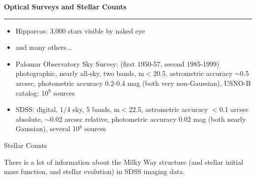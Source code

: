 \documentclass[letterpaper,landscape]{slides}
\begin{document}
\begin{slide}
\begin{center}
\bfseries
{\large {\color{red} Optical Surveys and Stellar Counts}}
\end{center}
\vskip 0.2in
\hrule

\vskip 0.1in
\begin{itemize}
\item { Hipparcos:} 3,000 stars visible by naked eye
\item { and many others...} 
\item { Palomar Observatory Sky Survey:} (first 1950-57, second 1985-1999) 
         photographic, nearly all-sky, 
         two bands, m$<$20.5, astrometric accuracy $\sim$0.5 arcsec, photometric
         accuracy 0.2-0.4 mag (both very non-Gaussian), USNO-B catalog: 10$^9$ sources
\item { SDSS:} digital, 1/4 sky, 5 bands, m$<$22.5, astrometric accuracy 
        $<$0.1 arcsec absolute,  $\sim$0.02 arcsec relative, photometric
         accuracy 0.02 mag (both nearly Gaussian), several 10$^8$ sources
\end{itemize}
\end{slide}
 




\begin{slide}
\begin{center}
{\large \color{red} 
                    Stellar Counts
}
\end{center}

{\color{blue} 
There is a lot of information about the Milky Way structure (and stellar
initial mass function, and stellar evolution) in SDSS imaging data.
}

\vfill
\end{slide}


\end{document}
